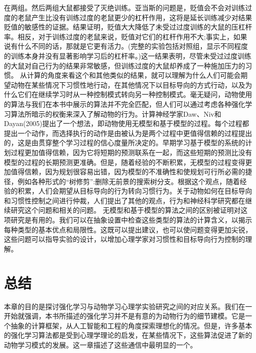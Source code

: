 在两组。然后两组大鼠都接受了灭绝训练。亚当斯的问题是，贬值会不会对训练过度的老鼠产生比没有训练过度的老鼠更少的杠杆作用，这将是延长训练减少对结果贬值的敏感性的证据。结果证明，贬值大大降低了未受过过度训练的大鼠的压杠杆率。相反，对于训练过度的老鼠来说，贬值对它们的杠杆作用不大;事实上，如果说有什么不同的话，那就是它更有活力。(完整的实验包括对照组，显示不同程度的训练本身并没有显著影响学习后的杠杆率。)这一结果表明，尽管未受过过度训练的大鼠对自己行为的结果非常敏感，但训练过度的大鼠却养成了一种施加压力的习惯。
从计算的角度来看这个和其他类似的结果，就可以理解为什么人们可能会期望动物在某些情况下习惯性地行动，在其他情况下以目标导向的方式行动，以及为什么它们在继续学习时从一种控制模式转向另一种控制模式。毫无疑问，动物使用的算法与我们在本书中展示的算法并不完全匹配，但人们可以通过考虑各种强化学习算法所暗示的权衡来深入了解动物的行为。计算神经学家Daw、Niv和Dayan(2005)提出了一个想法，即动物使用无模型和基于模型的过程。每个过程都提出一个动作，而选择执行的动作是由被认为是两个过程中更值得信赖的过程提出的，这是由贯穿整个学习过程的信心度量所决定的。早期学习基于模型的系统的计划过程更加值得信赖，因为它将短期的预测联系在一起，而这些短期的预测比没有模型的过程的长期预测更准确。但是，随着经验的不断积累，无模型的过程变得更加值得信赖，因为规划很容易出错，因为模型的不准确性和使规划可行所必需的捷径，例如各种形式的“树修剪”:删除无前景的搜索树分支。根据这个观点，随着经验的积累，人们会期望从目标导向的行为转向习惯行为。关于动物如何在目标导向和习惯性控制之间进行仲裁，人们提出了其他的观点，行为和神经科学研究都在继续研究这个问题和相关的问题。
无模型和基于模型的算法之间的区别被证明对这项研究是有用的。我们可以在抽象设置中检查这些类型的算法的计算含义，以揭示每种类型的基本优点和局限性。这既可以提出建议，也可以使问题变得更加尖锐，这些问题可以指导实验的设计，以增加心理学家对习惯性和目标导向行为控制的理解。


\section{总结}

本章的目的是探讨强化学习与动物学习心理学实验研究之间的对应关系。我们在一开始就强调，本书所描述的强化学习并不是有意的为动物行为的细节建模。它是一个抽象的计算框架，从人工智能和工程的角度探索理想化的情况。但是，许多基本的强化学习算法都是受到心理学理论的启发，在某些情况下，这些算法促进了新的动物学习模式的发展。这一章描述了这些通信中最明显的一个。

